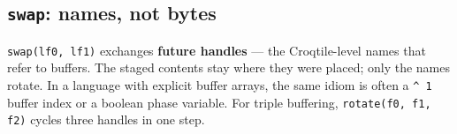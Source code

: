 \subsection*{\texttt{swap}: names, not bytes}

\texttt{swap(lf0, lf1)} exchanges \textbf{future handles} --- the Croqtile-level names that refer to buffers. The staged contents stay where they were placed; only the names rotate. In a language with explicit buffer arrays, the same idiom is often a \texttt{\textasciicircum{} 1} buffer index or a boolean phase variable. For triple buffering, \texttt{rotate(f0, f1, f2)} cycles three handles in one step.
